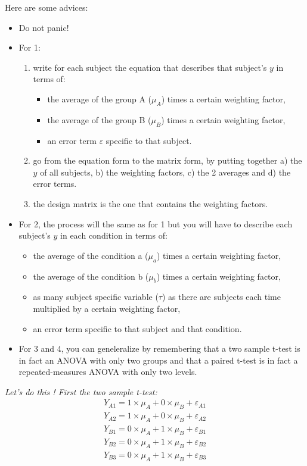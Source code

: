 \documentclass[a4paper,10pt]{article}
\begin{document}
\bigskip
Here are some advices:
\begin{itemize}
 \item Do not panic!
 \item For 1: 
  \begin{enumerate}
    \item write for each subject the equation that describes that subject's $y$ in terms of:
      \begin{itemize}
	\item the average of the group A ($\mu_{A}$) times a certain weighting factor, 
	\item the average of the group B ($\mu_{B}$) times a certain weighting factor,
	\item an error term $\varepsilon$ specific to that subject.
      \end{itemize}
    \item go from the equation form to the matrix form, by putting together a) the $y$ of all subjects, b) the weighting factors, c) the 2 averages and d) the error terms.
    \item the design matrix is the one that contains the weighting factors.
  \end{enumerate}
  
 \item For 2, the process will the same as for 1 but you will have to describe each subject's $y$ in each condition in terms of:
    \begin{itemize}
      \item the average of the condition a ($\mu_{a}$) times a certain weighting factor, 
      \item the average of the condition b ($\mu_{b}$) times a certain weighting factor,
      \item as many subject specific variable ($\tau$) as there are subjects each time multiplied by a certain weighting factor,
      \item an error term specific to that subject and that condition.
    \end{itemize}

    \item For 3 and 4, you can geneleralize by remembering that a two sample t-test is in fact an ANOVA with only two groups and that a paired t-test is in fact a repeated-measures ANOVA with only two levels.
\end{itemize}

\textit{Let's do this ! First the two sample t-test:}
\begin{align*}
Y_{A1} = 1 \times \mu_{A} + 0 \times \mu_{B} + \varepsilon_{A1} \\
Y_{A2} = 1 \times \mu_{A} + 0 \times \mu_{B} + \varepsilon_{A2} \\
Y_{B1} = 0 \times \mu_{A} + 1 \times \mu_{B} + \varepsilon_{B1} \\
Y_{B2} = 0 \times \mu_{A} + 1 \times \mu_{B} + \varepsilon_{B2} \\
Y_{B3} = 0 \times \mu_{A} + 1 \times \mu_{B} + \varepsilon_{B3} \\
\end{align*}
\end{document}
